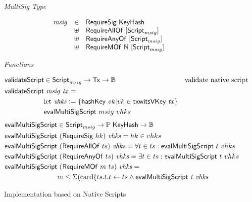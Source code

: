 \documentclass[11pt,a4paper,dvipsnames,twosided]{article}
\newcommand{\N}{\ensuremath{\mathbb{N}}}
\newcommand{\Bool}{\ensuremath{\mathbb{B}}}
\newcommand{\Tx}{\type{Tx}}
\newcommand{\Script}{\type{Script}}
\newcommand{\ScriptMSig}{\Script_{msig}}
\newcommand{\KeyHash}{\type{KeyHash}}
\theoremstyle{definition}
\newcommand{\leteq}{\ensuremath{\mathrel{\mathop:}=}}
\begin{document}
\begin{figure*}[hbt]
  \emph{MultiSig Type}

  \begin{equation*}
    \begin{array}{rll}
      \var{msig} & \in & \type{RequireSig}~\KeyHash\\
      & \uniondistinct &
         \type{RequireAllOf}~[\ScriptMSig] \\
      & \uniondistinct&
         \type{RequireAnyOf}~[\ScriptMSig] \\
      & \uniondistinct&
        \type{RequireMOf}~\N~[\ScriptMSig]
    \end{array}
  \end{equation*}

  \emph{Functions}

  \begin{align*}
    \fun{validateScript} & \in\ScriptMSig\to\Tx\to\Bool & \text{validate native
                                                          script} \\
    \fun{validateScript} & ~\var{msig}~\var{tx}= \\
                         & \textrm{let}~\var{vhks}\leteq \{\fun{hashKey}~vk \vert
                           vk \in \fun{txwitsVKey}~\var{tx}\} \\
                         & \fun{evalMultiSigScript}~msig~vhks\\
  \end{align*}
  \begin{align*}
    \fun{evalMultiSigScript} & \in\ScriptMSig\to\powerset\KeyHash\to\Bool & \\
    \fun{evalMultiSigScript} & ~(\type{RequireSig}~hk)~\var{vhks} =  hk \in vhks \\
    \fun{evalMultiSigScript} & ~(\type{RequireAllOf}~ts)~\var{vhks} =
                              \forall t \in ts: \fun{evalMultiSigScript}~t~vhks\\
    \fun{evalMultiSigScript} & ~(\type{RequireAnyOf}~ts)~\var{vhks} =
                              \exists t \in ts: \fun{evalMultiSigScript}~t~vhks\\
    \fun{evalMultiSigScript} & ~(\type{RequireMOf}~m~ts)~\var{vhks} = \\
                             & m \leq \Sigma
                               (\textrm{card} \{ t s.t. t \leftarrow ts \wedge \fun{evalMultiSigScript}~\var{t}~\var{vhks}
  \end{align*}

  \caption{Implementation based on Native Scripts}
  \label{fig:types-msig}
\end{figure*}
\end{document}
